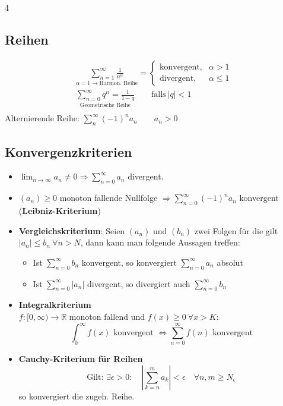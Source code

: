 \documentclass[6pt,a4paper]{scrartcl}
\begin{document}
\begin{multicols*}{4}
	\subsection{Reihen}
	\begin{eqnarray*}
		\underset{\alpha = 1 \rightarrow \text{Harmon. Reihe}}{\sum_{n=1}^\infty \frac{1}{n^\alpha}} = \begin{cases} \text{konvergent}, & \alpha > 1 \\ \text{divergent}, & \alpha \le 1 \end{cases} \\ \underset{\text{Geometrische Reihe}}{\sum_{n=0}^\infty q^n = \frac{1}{1-q}} \qquad \text{falls}\ |q|<1 \\
	\end{eqnarray*}
	Alternierende Reihe: $\sum_{n}^{\infty}(-1)^n a_n \qquad a_n>0$

	\begin{sectionbox}
		\subsection{Konvergenzkriterien}
		\begin{itemize}
			\item $\lim_{n\to\infty}a_n \ne 0 \Longrightarrow \sum^{\infty}_{n = 0} a_n$ divergent.
			\item $(a_n) \ge 0$ monoton fallende Nullfolge $\Longrightarrow \sum^{\infty}_{n = 0}(-1)^n a_n$ konvergent (\textbf{Leibniz-Kriterium})
			\item \textbf{Vergleichskriterium}: Seien $(a_n)$ und $(b_n)$ zwei Folgen für die gilt $|a_n| \le b_n \ \forall n > N$, dann kann man folgende Aussagen treffen:
			      \begin{itemize}\itemsep0pt
				      \item Ist $\sum_{n=0}^{\infty} b_n$ konvergent, so konvergiert $\sum_{n=0}^{\infty} a_n$ absolut
				      \item Ist $\sum_{n=0}^{\infty} |a_n|$ divergent, so divergiert auch $\sum_{n=0}^{\infty} b_n$
			      \end{itemize}
			\item \textbf{Integralkriterium}\\
			      $f: [0, \infty) \rightarrow \mathbb R$ monoton fallend und $f(x) \ge 0 \ \forall x > K$: \\
			      \[
				      \int_{0}^{\infty}f(x) \text{ konvergent } \Leftrightarrow \sum_{n=0}^{\infty}f(n) \text{ konvergent}
			      \]
			\item \textbf{Cauchy-Kriterium für Reihen}
			      \[
				      \text{Gilt: } \exists \epsilon > 0: \quad \left|\sum_{k=n}^{m}a_k\right| < \epsilon \quad \forall n,m \ge N_\epsilon
			      \]
			      so konvergiert die zugeh. Reihe.
		\end{itemize}


\end{sectionbox}
\end{multicols*}
\end{document}
